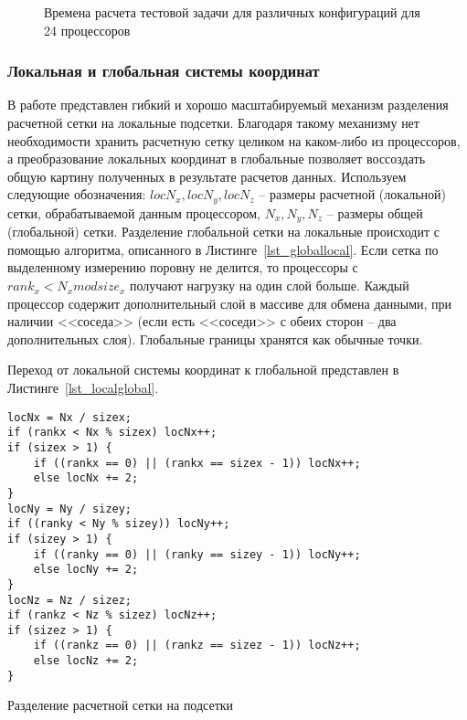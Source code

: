 \begin{figure}[!h]
\begin{center}
\caption{Времена расчета тестовой задачи для различных конфигураций для 24 процессоров}
\label{diagr_div}
\end{center}
\end{figure}

\subsubsection{Локальная и глобальная системы координат}
В работе представлен гибкий и хорошо масштабируемый механизм разделения
расчетной сетки на локальные подсетки. Благодаря такому механизму
нет необходимости хранить расчетную сетку целиком на каком-либо из
процессоров, а преобразование локальных координат в глобальные
позволяет воссоздать общую картину полученных в результате расчетов
данных.
Используем следующие обозначения:
$locN_x, locN_y, locN_z$ -- размеры расчетной (локальной) сетки, обрабатываемой
данным процессором, $N_x, N_y, N_z$ -- размеры общей (глобальной) сетки.
Разделение глобальной сетки на локальные происходит с~ помощью
алгоритма, описанного в Листинге~\ref{lst_globallocal}. 
Если сетка по выделенному измерению поровну не делится, то процессоры с $rank_x < N_x mod size_x$ получают нагрузку
на один слой больше. Каждый процессор содержит дополнительный слой в массиве для обмена данными, при 
наличии <<соседа>> (если есть <<соседи>> с обеих сторон -- два дополнительных слоя).
Глобальные границы хранятся как обычные точки.

Переход от локальной
системы координат к глобальной представлен в Листинге~\ref{lst_localglobal}.

\begin{listing}[!h]
\begin{verbatim}
locNx = Nx / sizex;
if (rankx < Nx % sizex) locNx++;
if (sizex > 1) {
    if ((rankx == 0) || (rankx == sizex - 1)) locNx++;
    else locNx += 2;
}
locNy = Ny / sizey;
if ((ranky < Ny % sizey)) locNy++;
if (sizey > 1) {
    if ((ranky == 0) || (ranky == sizey - 1)) locNy++;
    else locNy += 2;
}
locNz = Nz / sizez;
if (rankz < Nz % sizez) locNz++;
if (sizez > 1) {
    if ((rankz == 0) || (rankz == sizez - 1)) locNz++;
    else locNz += 2;
}
\end{verbatim}
\caption{Разделение расчетной сетки на подсетки}
\label{lst_globallocal}
\end{listing}

